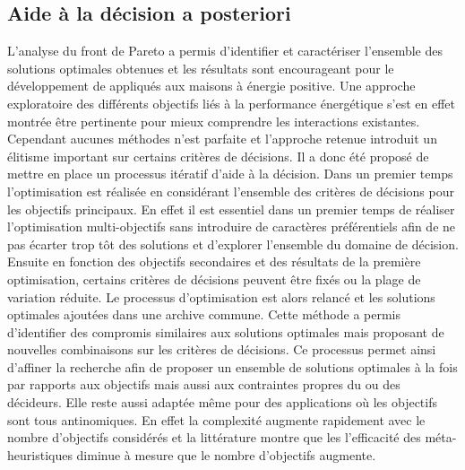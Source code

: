 \subsection{Aide à la décision a posteriori} %
\label{sub:aide_a_la_décision_a_posteriori}
L’analyse du front de Pareto a permis d’identifier et caractériser l’ensemble des
solutions optimales obtenues et les résultats sont encourageant pour le développement de
 appliqués aux maisons à énergie positive. Une approche exploratoire des
différents objectifs liés à la performance énergétique s’est en effet montrée être
pertinente pour mieux comprendre les interactions existantes. Cependant aucunes méthodes
n’est parfaite et l’approche retenue introduit un élitisme important sur certains critères
de décisions. Il a donc été proposé de mettre en place un processus itératif d’aide à la
décision. Dans un premier temps l’optimisation est réalisée en considérant l’ensemble des
critères de décisions pour les objectifs principaux. En effet il est essentiel dans un
premier temps de réaliser l’optimisation multi-objectifs sans introduire de caractères
préférentiels afin de ne pas écarter trop tôt des solutions et d’explorer l’ensemble du
domaine de décision. Ensuite en fonction des objectifs secondaires et des résultats de la
première optimisation, certains critères de décisions peuvent être fixés ou la plage de
variation réduite. Le processus d’optimisation est alors relancé et les solutions
optimales ajoutées dans une archive commune. Cette méthode a permis d’identifier des
compromis similaires aux solutions optimales mais proposant de nouvelles combinaisons sur
les critères de décisions. Ce processus permet ainsi d’affiner la recherche afin de
proposer un ensemble de solutions optimales à la fois par rapports aux objectifs mais
aussi aux contraintes propres du ou des décideurs. Elle reste aussi adaptée même pour des
applications où les objectifs sont tous antinomiques. En effet la complexité augmente
rapidement avec le nombre d’objectifs considérés et la littérature montre que les
l’efficacité des méta-heuristiques diminue à mesure que le nombre d’objectifs augmente.

